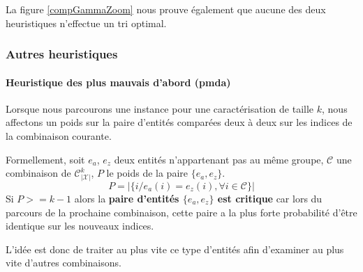 La figure \ref{compGammaZoom} nous prouve également que aucune des deux heuristiques n'effectue un tri optimal.

\subsubsection{Autres heuristiques }
\paragraph{Heuristique des plus mauvais d'abord (pmda)}
Lorsque nous parcourons une instance pour une caractérisation de taille $k$, nous affectons un poids sur la paire d'entités comparées deux à deux sur les indices de la combinaison courante.



\begin{definition}
Formellement, soit $e_a$, $e_z$ deux entités n'appartenant pas au même groupe, $\mathcal{C}$ une combinaison de $\mathcal{C}_{|\mathcal{X}|}^k$, $P$ le poids de la paire $\{e_a,e_z\}$.
$$ P = |\{i / e_a(i)=e_z(i), \forall i \in \mathcal{C}\}| $$
Si $P>=k-1$ alors la \textbf{paire d'entités $\{e_a,e_z\}$ est critique} car lors du parcours de la prochaine combinaison, cette paire a la plus forte probabilité d'être identique sur les nouveaux indices.
\end{definition}

L'idée est donc de traiter au plus vite ce type d'entités afin d'examiner au plus vite d'autres combinaisons.

